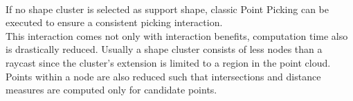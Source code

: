 \\
If no shape cluster is selected as support shape, classic Point Picking can be executed to ensure a consistent picking interaction. 
\\
This interaction comes not only with interaction benefits, computation time also is drastically reduced. Usually a shape cluster consists of less nodes than a raycast since the cluster's extension is limited to a region in the point cloud. Points within a node are also reduced such that intersections and distance measures are computed only for candidate points. 

